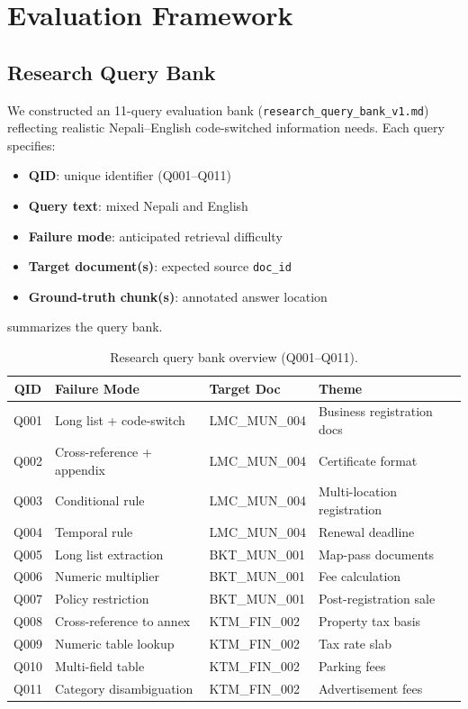 \chapter{Evaluation Framework}
\label{ch:evaluation}

\section{Research Query Bank}
We constructed an 11-query evaluation bank (\texttt{research\_query\_bank\_v1.md}) reflecting realistic Nepali--English code-switched information needs. Each query specifies:
\begin{itemize}[leftmargin=*]
  \item \textbf{QID}: unique identifier (Q001--Q011)
  \item \textbf{Query text}: mixed Nepali and English
  \item \textbf{Failure mode}: anticipated retrieval difficulty
  \item \textbf{Target document(s)}: expected source \texttt{doc\_id}
  \item \textbf{Ground-truth chunk(s)}: annotated answer location
\end{itemize}

 summarizes the query bank.

\begin{table}[H]
  \centering
  \caption{Research query bank overview (Q001--Q011).}
  \label{tab:query-bank}
  \small
  \begin{tabular}{@{}clll@{}}
    \toprule
    \textbf{QID} & \textbf{Failure Mode} & \textbf{Target Doc} & \textbf{Theme} \\
    \midrule
    Q001 & Long list + code-switch & LMC\_MUN\_004 & Business registration docs \\
    Q002 & Cross-reference + appendix & LMC\_MUN\_004 & Certificate format \\
    Q003 & Conditional rule & LMC\_MUN\_004 & Multi-location registration \\
    Q004 & Temporal rule & LMC\_MUN\_004 & Renewal deadline \\
    Q005 & Long list extraction & BKT\_MUN\_001 & Map-pass documents \\
    Q006 & Numeric multiplier & BKT\_MUN\_001 & Fee calculation \\
    Q007 & Policy restriction & BKT\_MUN\_001 & Post-registration sale \\
    Q008 & Cross-reference to annex & KTM\_FIN\_002 & Property tax basis \\
    Q009 & Numeric table lookup & KTM\_FIN\_002 & Tax rate slab \\
    Q010 & Multi-field table & KTM\_FIN\_002 & Parking fees \\
    Q011 & Category disambiguation & KTM\_FIN\_002 & Advertisement fees \\
    \bottomrule
  \end{tabular}
\end{table}


